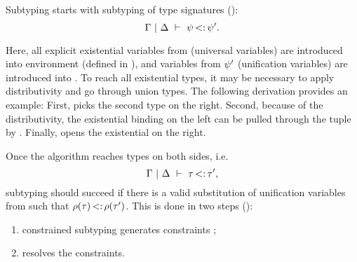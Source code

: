 Subtyping starts with subtyping of type signatures
():
\[ \Gamma~\vert~\Delta\ \vdash\ \psi \operatorname{<:} \psi'. \]

Here, all explicit existential variables from \tysig (universal variables)
are introduced into environment \AEnv (defined in ), 
and variables from $\psi'$ (unification variables) are introduced into \UEnv.
To reach all existential types, it may be necessary to apply distributivity
and go through union types. The following derivation provides an example:
First,  picks the second type on the right.
Second, because of the distributivity, the existential binding on the left
can be pulled through the tuple by .
Finally,  opens the existential on the right.

Once the algorithm reaches types on both sides,
i.e. \[ \Gamma~\vert~\Delta\ \vdash\ \tau \operatorname{<:} \tau', \]
subtyping should succeed if there is 
a valid substitution \substvars of unification variables from \UEnv
such that $\rho(\tau) \operatorname{<:} \rho(\tau')$.
This is done in two steps ():
\begin{enumerate}
    \item constrained subtyping 
      generates constraints \CSet;
    \item \solvectrdflt resolves the constraints.
\end{enumerate}

